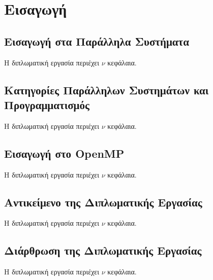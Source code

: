 \chapter{Εισαγωγή}
\label{ch:Introduction}

\section{Εισαγωγή στα Παράλληλα Συστήματα}
\label{sec:Introduction to Parallel Systems}
Η διπλωματική εργασία περιέχει $\nu$ κεφάλαια.

\section{Κατηγορίες Παράλληλων Συστημάτων και Προγραμματισμός}
\label{sec:Parallel System Categories}
Η διπλωματική εργασία περιέχει $\nu$ κεφάλαια.

\section{Εισαγωγή στο OpenMP}
\label{sec:Introduction to OpenMP}
Η διπλωματική εργασία περιέχει $\nu$ κεφάλαια.

\section{Αντικείμενο της Διπλωματικής Εργασίας}
\label{sec:Subject of the Diploma Thesis}
Η διπλωματική εργασία περιέχει $\nu$ κεφάλαια.

\section{Διάρθρωση της Διπλωματικής Εργασίας}
\label{sec:Structure of the Diploma Thesis}
Η διπλωματική εργασία περιέχει $\nu$ κεφάλαια.

